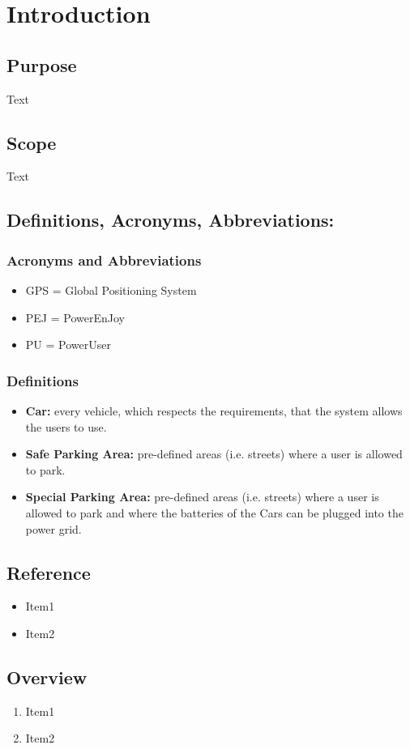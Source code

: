 \section{Introduction}
\subsection{Purpose}
Text
\subsection{Scope}
Text
\subsection{Definitions, Acronyms, Abbreviations:}
\subsubsection{Acronyms and Abbreviations}
\begin{itemize}
\item GPS = Global Positioning System
\item PEJ = PowerEnJoy
\item PU = PowerUser
\end{itemize}
\subsubsection{Definitions}
\begin{itemize}
\item \textbf{Car:} every vehicle, which respects the requirements, that the system allows the users to use.
\item \textbf{Safe Parking Area:} pre-defined areas (i.e. streets) where a user is allowed to park.
\item \textbf{Special Parking Area:}  pre-defined areas (i.e. streets) where a user is allowed to park and where the batteries of the Cars can be plugged into the power grid.
\end{itemize}
\subsection{Reference}
\begin{itemize}
\item Item1
\item Item2
\end{itemize}
\subsection{Overview}
\begin{enumerate}
\item Item1
\item Item2
\end{enumerate}